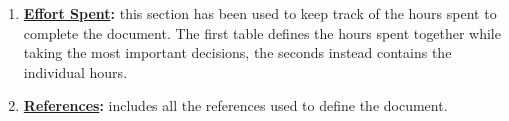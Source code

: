\begin{enumerate}
			\item \textbf{\hyperref[sec:effortSpent]{Effort Spent}:} this section has been used to keep track of the hours spent to complete the document. The first table defines the hours spent together while taking the most important decisions, the seconds instead contains the individual hours.
			
			\item \textbf{\hyperref[sec:references]{References}:} includes all the references used to define the document.
		\end{enumerate}			